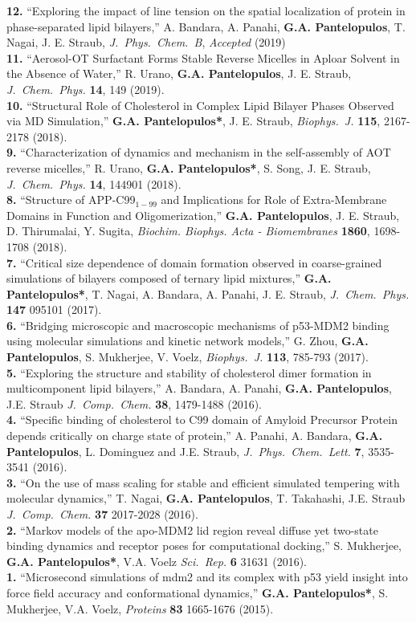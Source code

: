 \documentclass[a4paper]{article}
\def\jcc{\it J.~Comp.~Chem.}
\def\jpcb{\it J.~Phys.~Chem.~B}
\def\jpcl{\it J.~Phys.~Chem.~Lett.}
\def\prot{\it Proteins}
\def\jcp{\it J.~Chem.~Phys.}
\def\bj{\it Biophys.~J.}
\def\jpcb{\it J.~Phys.~Chem.~B}
\def\jpcl{\it J.~Phys.~Chem.~Lett.}
\def\scirep{\it Sci.~Rep.}
\begin{document}
{\bf 12.} ``Exploring the impact of line tension on the spatial localization of protein in phase-separated lipid bilayers,''  A. Bandara, A. Panahi, \textbf{G.A. Pantelopulos}, T. Nagai, J. E. Straub, {\jpcb}, \textit{Accepted} (2019)\\
{\bf 11.} ``Aerosol-OT Surfactant Forms Stable Reverse Micelles in Aploar Solvent in the Absence of Water,'' R. Urano, \textbf{G.A. Pantelopulos}, J. E. Straub, {\jcp} {\bf 14}, 149 (2019). \\
{\bf 10.} ``Structural Role of Cholesterol in Complex Lipid Bilayer Phases Observed via MD Simulation,'' \textbf{G.A. Pantelopulos*}, J. E. Straub, {\bj} {\bf 115}, 2167-2178 (2018). \\
{\bf 9.} ``Characterization of dynamics and mechanism in the self-assembly of AOT reverse micelles,'' R. Urano, \textbf{G.A. Pantelopulos*}, S. Song, J. E. Straub, {\jcp} {\bf 14}, 144901 (2018). \\
{\bf 8.} ``Structure of APP-C99$_{1-99}$ and Implications for Role of Extra-Membrane Domains in Function and Oligomerization,'' \textbf{G.A. Pantelopulos}, J. E. Straub, D. Thirumalai, Y. Sugita, \textit{Biochim. Biophys. Acta - Biomembranes} {\bf 1860}, 1698-1708 (2018). \\
{\bf 7.} ``Critical size dependence of domain formation observed in coarse-grained simulations of bilayers composed of ternary lipid mixtures,'' \textbf{G.A. Pantelopulos*}, T. Nagai, A. Bandara, A. Panahi, J. E. Straub, {\jcp} {\bf 147} 095101 (2017). \\
{\bf 6.} ``Bridging microscopic and macroscopic mechanisms of p53-MDM2 binding using molecular simulations and kinetic network models,'' G. Zhou, \textbf{G.A. Pantelopulos}, S. Mukherjee, V. Voelz, {\bj} {\bf 113},  785-793 (2017). \\
{\bf 5.} ``Exploring the structure and stability of cholesterol dimer formation in multicomponent lipid bilayers,'' A. Bandara, A. Panahi, \textbf{G.A. Pantelopulos}, J.E. Straub {\jcc} {\bf 38}, 1479-1488 (2016). \\
{\bf 4.}  ``Specific binding of cholesterol to C99 domain of Amyloid Precursor Protein depends critically on charge state of protein,'' A. Panahi, A. Bandara, \textbf{G.A. Pantelopulos}, L. Dominguez and J.E. Straub, {\jpcl} {\bf 7}, 3535-3541 (2016). \\
{\bf 3.} ``On the use of mass scaling for stable and efficient simulated tempering with molecular dynamics,'' T. Nagai, \textbf{G.A. Pantelopulos}, T. Takahashi, J.E. Straub {\jcc} {\bf 37} 2017-2028 (2016). \\
{\bf 2.} ``Markov models of the apo-MDM2 lid region reveal diffuse yet two-state binding dynamics and receptor poses for computational docking,'' S. Mukherjee, \textbf{G.A. Pantelopulos*}, V.A. Voelz {\scirep} {\bf 6} 31631 (2016). \\
{\bf 1.} ``Microsecond simulations of mdm2 and its complex with p53 yield insight into force field accuracy and conformational dynamics,'' \textbf{G.A. Pantelopulos*}, S. Mukherjee, V.A. Voelz, {\prot} {\bf 83} 1665-1676 (2015).
\end{document}
